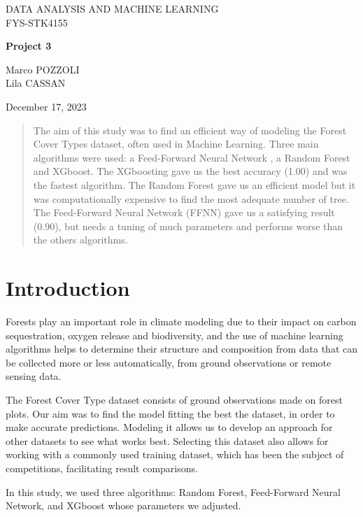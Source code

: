 \documentclass[letterpaper,12pt]{article}
\begin{document}
\begin{titlepage}
\begin{center}

\textsc{DATA ANALYSIS AND MACHINE LEARNING}\\
\textsc{FYS-STK4155}
\vspace{.3cm}

  {\LARGE
\textbf{Project 3}\par}
\vspace{3.5cm}
\hfill
\begin{minipage}{7cm}
Marco POZZOLI
\\
Lila CASSAN
\end{minipage}

\vfill

December 17, 2023

\end{center} 
\end{titlepage}


\newpage
\begin{abstract}
    The aim of this study was to find an efficient way of modeling the Forest Cover Types dataset, often used in Machine Learning. Three main algorithms were used: a Feed-Forward Neural Network , a Random Forest and XGboost.
    The XGboosting gave us the best accuracy (1.00) and was the fastest algorithm. The Random Forest gave us an efficient model but it was computationally expensive to find the most adequate number of tree. The Feed-Forward Neural Network (FFNN) gave us a satisfying result (0.90), but needs a tuning of much parameters and performs worse than the others algorithms. 
    
\end{abstract}


\newpage
\section{Introduction}
\par Forests play an important role in climate modeling due to their impact on carbon sequestration, oxygen release and biodiversity, and the use of machine learning algorithms helps to determine their structure and composition from data that can be collected more or less automatically, from ground observations or remote sensing data.
\par The Forest Cover Type dataset consists of ground observations made on forest plots. Our aim was to find the model fitting the best the dataset, in order to make accurate predictions. Modeling it allows us to develop an approach for other datasets to see what works best. Selecting this dataset also allows for working with a commonly used training dataset, which has been the subject of competitions, facilitating result comparisons.
\par In this study, we used three algorithms: Random Forest, Feed-Forward Neural Network, and XGboost whose parameters we adjusted.
\end{document}
